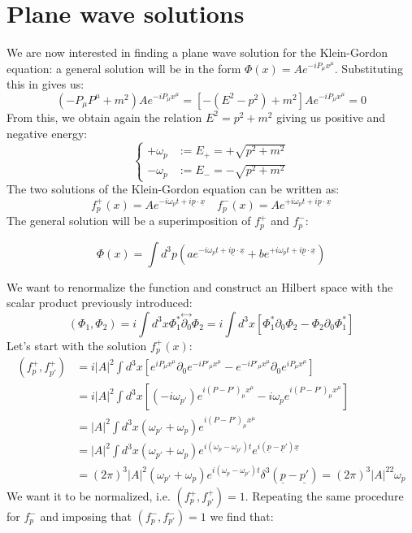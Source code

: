 \documentclass[../main.tex]{subfiles}
\begin{document}
\section{Plane wave solutions}
We are now interested in finding a plane wave solution for the Klein-Gordon equation: a general solution will be in the form $\Phi(x)=Ae^{-iP_\mu x^\mu}$. Substituting this in  gives us:
\[
(-P_\mu P^\mu+m^2)Ae^{-iP_\mu x^\mu}=[-(E^2-p^2)+m^2]Ae^{-iP_\mu x^\mu}=0
\]
From this, we obtain again the relation $E^2=p^2+m^2$ giving us positive and negative energy:
\[
\left\{
\begin{aligned}
+\omega_p&:=E_+=+\sqrt{p^2+m^2}\\
-\omega_p&:=E_-=-\sqrt{p^2+m^2}
\end{aligned}
\right.
\]
The two solutions of the Klein-Gordon equation can be written as:
\[
f^+_p(x)=Ae^{-i\omega_pt+i\underline{p}\cdot\underline{x}} \quad f^-_p(x)=Ae^{+i\omega_pt+i\underline{p}\cdot\underline{x}}
\]
The general solution will be a superimposition of $f^+_p$ and $f^-_p$:
\begin{kaobox}[frametitle=Solution of the Klein-Gordon equation]
\[
\Phi(x)=\int d^3p\left(ae^{-i\omega_pt+i\underline{p}\cdot\underline{x}}+be^{+i\omega_pt+i\underline{p}\cdot\underline{x}}\right)
\]
\end{kaobox}
We want to renormalize the function and construct an Hilbert space with the scalar product previously introduced:
\[
(\Phi_1,\Phi_2)=i\int d^3x\Phi^*_1\overset{\leftrightarrow}{\partial_0}\Phi_2=i\int d^3x\left[\Phi^*_1\partial_0\Phi_2-\Phi_2\partial_0\Phi^*_1\right]
\]
Let's start with the solution $f^+_p(x)$:
\begin{align*}
(f_p^+,f_{p'}^+)&=i|A|^2\int d^3x\left[e^{iP_\mu x^\mu}\partial_0e^{-iP'_\mu x^\mu}-e^{-iP'_\mu x^\mu}\partial_0e^{iP_\mu x^\mu}\right]\\
&=i|A|^2\int d^3x\left[(-i\omega_{p'})e^{i(P-P')_\mu x^\mu}-i\omega_pe^{i(P-P')_\mu x^\mu}\right]\\
&=|A|^2\int d^3x(\omega_{p'}+\omega_p)e^{i(P-P')_\mu x^\mu}\\
&=|A|^2\int d^3x(\omega_{p'}+\omega_p)e^{i(\omega_p-\omega_{p'})t}e^{i(\underline{p}-\underline{p}')\underline{x}}\\
&=(2\pi)^3|A|^2(\omega_{p'}+\omega_p)e^{i(\omega_p-\omega_{p'})t}\delta^3(\underline{p}-\underline{p'})=(2\pi)^3|A|^22\omega_p
\end{align*}
We want it to be normalized, i.e. $(f_p^+,f_{p'}^+)=1$. Repeating the same procedure for $f^-_p$ and imposing that $(f^-_p,f^-_{p'})=1$ we find that:
\end{document}
